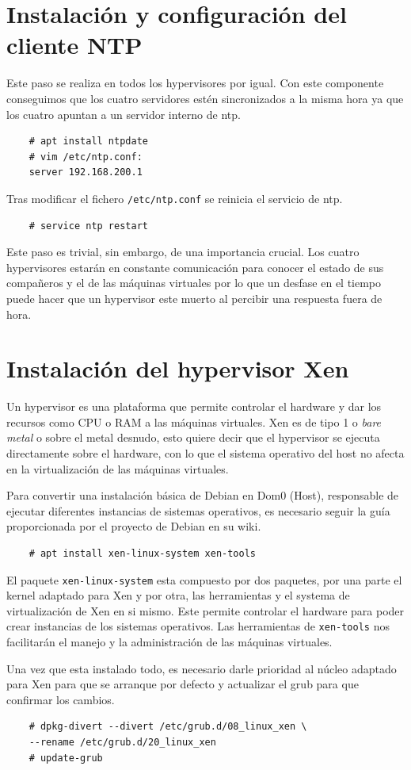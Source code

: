 \documentclass[12pt,a4paper,titlepage,twoside]{report}
\begin{document}
\section{Instalación y configuración del cliente NTP}
Este paso se realiza en todos los hypervisores por igual. Con este componente conseguimos que los cuatro servidores estén sincronizados a la misma hora ya que los cuatro apuntan a un servidor interno de ntp.
\begin{verbatim}
    # apt install ntpdate
    # vim /etc/ntp.conf:
    server 192.168.200.1
\end{verbatim}
\par Tras modificar el fichero \verb|/etc/ntp.conf| se reinicia el servicio de ntp.
\begin{verbatim}
	# service ntp restart
\end{verbatim}
\par Este paso es trivial, sin embargo, de una importancia crucial. Los cuatro hypervisores estarán en constante comunicación para conocer el estado de sus compañeros y el de las máquinas virtuales por lo que un desfase en el tiempo puede hacer que un hypervisor este muerto al percibir una respuesta fuera de hora.
\section{Instalación del hypervisor Xen}
Un hypervisor es una plataforma que permite controlar el hardware y dar los recursos como CPU o RAM a las máquinas virtuales. Xen es de tipo 1 o \textit{bare metal} o sobre el metal desnudo, esto quiere decir que el hypervisor se ejecuta directamente sobre el hardware, con lo que el sistema operativo del host no afecta en la virtualización de las máquinas virtuales.
\par Para convertir una instalación básica de Debian en Dom0 (Host), responsable de ejecutar diferentes instancias de sistemas operativos, es necesario seguir la guía\cite{debianxen} proporcionada por el proyecto de Debian en su wiki.
\begin{verbatim}
    # apt install xen-linux-system xen-tools
\end{verbatim}
El paquete \verb|xen-linux-system| esta compuesto por dos paquetes, por una parte el kernel adaptado para Xen y por otra, las herramientas y el systema de virtualización de Xen en si mismo. Este permite controlar el hardware para poder crear instancias de los sistemas operativos. Las herramientas de \verb|xen-tools| nos facilitarán el manejo y la administración de las máquinas virtuales.
\par Una vez que esta instalado todo, es necesario darle prioridad al núcleo adaptado para Xen para que se arranque por defecto y actualizar el grub para que confirmar los cambios.
\begin{verbatim}
    # dpkg-divert --divert /etc/grub.d/08_linux_xen \
    --rename /etc/grub.d/20_linux_xen
    # update-grub
\end{verbatim}
\end{document}
